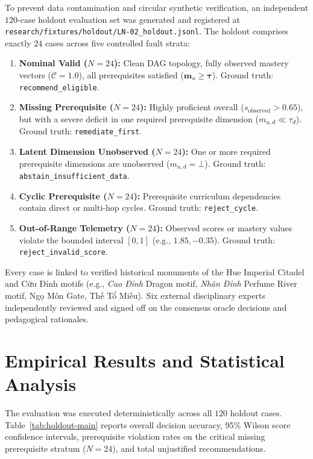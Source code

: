 \documentclass[11pt,a4paper]{article}
\begin{document}
To prevent data contamination and circular synthetic verification, an independent $120$-case holdout evaluation set was generated and registered at \texttt{research/fixtures/holdout/LN-02\_holdout.jsonl}. The holdout comprises exactly $24$ cases across five controlled fault strata:
\begin{enumerate}[leftmargin=2.0em]
    \item \textbf{Nominal Valid ($N=24$):} Clean DAG topology, fully observed mastery vectors ($\mathcal{C}=1.0$), all prerequisites satisfied ($\mathbf{m}_u \ge \boldsymbol{\tau}$). Ground truth: \texttt{recommend\_eligible}.
    \item \textbf{Missing Prerequisite ($N=24$):} Highly proficient overall ($s_{\text{observed}} > 0.65$), but with a severe deficit in one required prerequisite dimension ($m_{u, d} \ll \tau_d$). Ground truth: \texttt{remediate\_first}.
    \item \textbf{Latent Dimension Unobserved ($N=24$):} One or more required prerequisite dimensions are unobserved ($m_{u, d} = \bot$). Ground truth: \texttt{abstain\_insufficient\_data}.
    \item \textbf{Cyclic Prerequisite ($N=24$):} Prerequisite curriculum dependencies contain direct or multi-hop cycles. Ground truth: \texttt{reject\_cycle}.
    \item \textbf{Out-of-Range Telemetry ($N=24$):} Observed scores or mastery values violate the bounded interval $[0, 1]$ (e.g., $1.85, -0.35$). Ground truth: \texttt{reject\_invalid\_score}.
\end{enumerate}

Every case is linked to verified historical monuments of the Hue Imperial Citadel and Cửu Đỉnh motifs (e.g., \textit{Cao Đỉnh} Dragon motif, \textit{Nhân Đỉnh} Perfume River motif, Ngọ Môn Gate, Thế Tổ Miếu). Six external disciplinary experts independently reviewed and signed off on the consensus oracle decisions and pedagogical rationales.

\section{Empirical Results and Statistical Analysis}

The evaluation was executed deterministically across all $120$ holdout cases. Table~\ref{tab:holdout-main} reports overall decision accuracy, 95\% Wilson score confidence intervals, prerequisite violation rates on the critical missing prerequisite stratum ($N=24$), and total unjustified recommendations.
\end{document}

